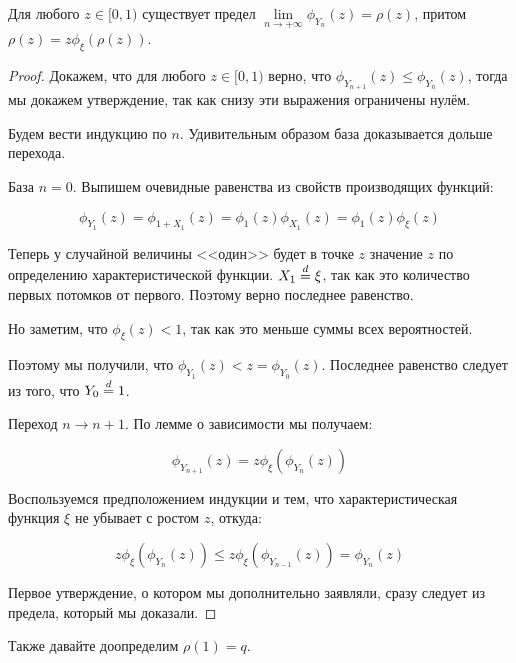 \begin{lemma}
  Для любого $z \in [0, 1)$ существует предел $\lim\limits_{n \to +\infty} 
  \phi_{Y_n}(z) = \rho(z)$, притом $\rho(z) = z\phi_{\xi}(\rho(z))$.
\end{lemma}

\begin{proof}
  Докажем, что для любого $z \in [0, 1)$ верно, что
  $\phi_{Y_{n + 1}}(z) \leqslant \phi_{Y_n}(z)$, тогда мы докажем утверждение,
  так как снизу эти выражения ограничены нулём.

  Будем вести индукцию по $n$. Удивительным образом база доказывается дольше
  перехода. 

  База $n = 0$. Выпишем очевидные равенства из свойств производящих функций:

  \[
    \phi_{Y_1}(z) = \phi_{1 + X_1}(z) = \phi_{1}(z)\phi_{X_1}(z) = 
    \phi_{1}(z)\phi_{\xi}(z)
  \]

  Теперь у случайной величины <<один>> будет в точке $z$ значение $z$ по определению
  характеристической функции. $X_1 \overset{d}{=} \xi$, так как это количество
  первых потомков от первого. Поэтому верно последнее равенство.

  Но заметим, что $\phi_{\xi}(z) < 1$, так как это меньше суммы всех вероятностей.

  Поэтому мы получили, что $\phi_{Y_1}(z) < z = \phi_{Y_0}(z)$. Последнее равенство
  следует из того, что $Y_0 \overset{d}{=} 1$.

  Переход $n \to n + 1$. По лемме о зависимости мы получаем:

  \[
    \phi_{Y_{n + 1}}(z) = z\phi_{\xi}(\phi_{Y_n}(z))
  \]

  Воспользуемся предположением индукции и тем, что характеристическая функция
  $\xi$ не убывает с ростом $z$, откуда:

  \[
    z\phi_{\xi}(\phi_{Y_n}(z)) \leqslant z\phi_{\xi}(\phi_{Y_{n - 1}}(z)) =
    \phi_{Y_n}(z)
  \]

  Первое утверждение, о котором мы дополнительно заявляли, сразу следует из предела,
  который мы доказали.

\end{proof}

Также давайте доопределим $\rho(1) = q$.
